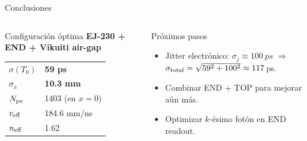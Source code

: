 \documentclass[aspectratio=169,9pt]{beamer}
\begin{document}
\begin{frame}{Conclusiones}
\begin{columns}[T]
    \begin{block}{\textcolor{bestgreen}{Configuraci\'on \'optima}}
      \centering
      \textbf{EJ-230 + END + Vikuiti air-gap}\\[0.5em]
      \begin{tabular}{ll}
        $\sigma(T_0)$     & \textbf{59 ps} \\
        $\sigma_x$        & \textbf{10.3 mm} \\
        $N_{\rm pe}$      & 1403 (en $x=0$) \\
        $v_{\rm eff}$     & 184.6 mm/ns \\
        $n_{\rm eff}$     & 1.62 \\
      \end{tabular}
    \end{block}
    \vspace{0.3em}
    \begin{alertblock}{Pr\'oximos pasos}
      \begin{itemize}
        \item Jitter electr\'onico: $\sigma_j \approx \SI{100}{ps}$
              $\Rightarrow$ $\sigma_{\rm total} = \sqrt{59^2 + 100^2} \approx 117$\,ps.
        \item Combinar END + TOP para mejorar a\'un m\'as.
        \item Optimizar $k$-\'esimo fot\'on en END readout.
      \end{itemize}
    \end{alertblock}
  \end{columns}
\end{frame}
\end{document}
